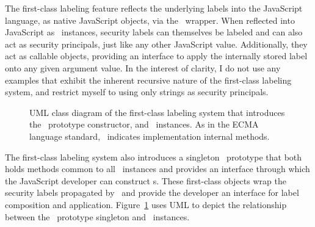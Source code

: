 The first-class labeling feature reflects the underlying labels into the JavaScript language, as native JavaScript objects, via the \FlowLabelObject\ wrapper.
When reflected into JavaScript as \FlowLabelObject\ instances, security labels can themselves be labeled and can also act as security principals, just like any other JavaScript value.
Additionally, they act as callable objects, providing an interface to apply the internally stored label onto any given argument value.
In the interest of clarity, I do not use any examples that exhibit the inherent recursive nature of the first-class labeling system, and restrict myself to using only strings as security principals.

\begin{figure}[ht]
  \centering
{}
  \caption{UML class diagram of the first-class labeling system that introduces the \FlowLabel\ prototype constructor, and \FlowLabelObject\ instances.
  As in the ECMA~\cite{ecma} language standard, \textlbrackdbl \textbullet \textrbrackdbl\ indicates implementation internal methods.}
  \label{fig:uml}
\end{figure}

The first-class labeling system also introduces a singleton \FlowLabel\ prototype that both holds methods common to all \FlowLabelObject\ instances and provides an interface through which the JavaScript developer can construct \FlowLabelObject s.
These first-class objects wrap the security labels propagated by \FlowCore\ and provide the developer an interface for label composition and application.
Figure~\ref{fig:uml} uses UML to depict the relationship between the \FlowLabel\ prototype singleton and \FlowLabelObject\ instances.

